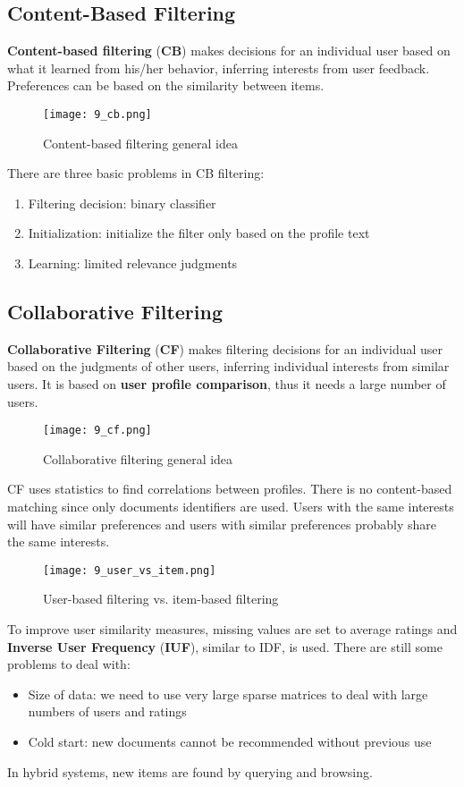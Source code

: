 \documentclass{article}
\begin{document}
\subsection{Content-Based Filtering}
\textbf{Content-based filtering} (\textbf{CB}) makes decisions for an individual user based on what it learned from his/her behavior, inferring interests from user feedback. Preferences can be based on the similarity between items.
\begin{figure}[H]
    \centering
    \texttt{[image: 9\_cb.png]}
    \caption{Content-based filtering general idea}
\end{figure}
There are three basic problems in CB filtering:
\begin{enumerate}
    \item Filtering decision: binary classifier
    \item Initialization: initialize the filter only based on the profile text
    \item Learning: limited relevance judgments 
\end{enumerate}

\subsection{Collaborative Filtering}
\textbf{Collaborative Filtering} (\textbf{CF}) makes filtering decisions for an individual user based on the judgments of other users, inferring individual interests from similar users. It is based on \textbf{user profile comparison}, thus it needs a large number of users.
\begin{figure}[H]
    \centering
    \texttt{[image: 9\_cf.png]}
    \caption{Collaborative filtering general idea}
\end{figure}
CF uses statistics to find correlations between profiles. There is no content-based matching since only documents identifiers are used. Users with the same interests will have similar preferences and users with similar preferences probably share the same interests.
\begin{figure}[H]
    \centering
    \texttt{[image: 9\_user\_vs\_item.png]}
    \caption{User-based filtering vs. item-based filtering}
\end{figure}
To improve user similarity measures, missing values are set to average ratings and \textbf{Inverse User Frequency} (\textbf{IUF}), similar to IDF, is used. There are still some problems to deal with:
\begin{itemize}
    \item Size of data: we need to use very large sparse matrices to deal with large numbers of users and ratings
    \item Cold start: new documents cannot be recommended without previous use
\end{itemize}
In hybrid systems, new items are found by querying and browsing.
\end{document}
